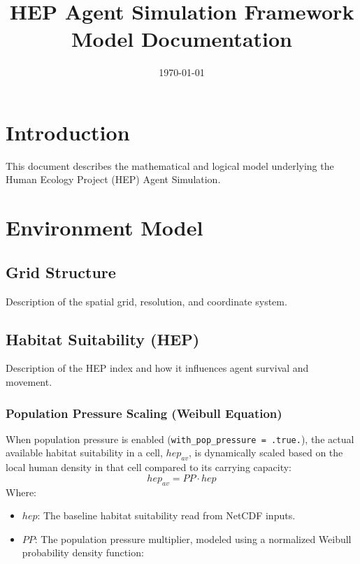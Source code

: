 \documentclass[11pt,a4paper]{report}
\title{\textbf{HEP Agent Simulation Framework}\\ \large Model Documentation}
\date{\today}
\begin{document}
\maketitle
\tableofcontents

\chapter{Introduction}
This document describes the mathematical and logical model underlying the Human Ecology Project (HEP) Agent Simulation.

\chapter{Environment Model}
\section{Grid Structure}
Description of the spatial grid, resolution, and coordinate system.

\section{Habitat Suitability (HEP)}
Description of the HEP index and how it influences agent survival and movement.

\subsection{Population Pressure Scaling (Weibull Equation)}
When population pressure is enabled (\texttt{with\_pop\_pressure = .true.}), the actual available habitat suitability in a cell, $hep_{av}$, is dynamically scaled based on the local human density in that cell compared to its carrying capacity:
\begin{equation}
    hep_{av} = PP \cdot hep
\end{equation}
Where:
\begin{itemize}
    \item $hep$: The baseline habitat suitability read from NetCDF inputs.
    \item $PP$: The population pressure multiplier, modeled using a normalized Weibull probability density function:
\end{itemize}
\end{document}
